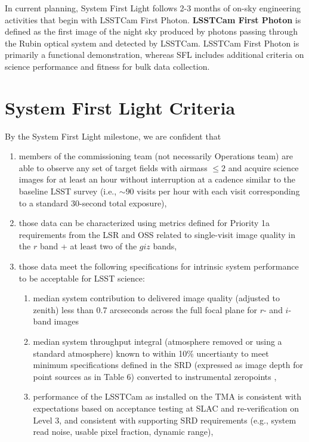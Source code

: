 \documentclass[SE,authoryear,toc]{lsstdoc}
\begin{document}
In current planning, System First Light follows 2-3 months of on-sky engineering activities that begin with LSSTCam First Photon.
\textbf {LSSTCam First Photon} is defined as the first image of the night sky produced by photons passing through the Rubin optical system and detected by LSSTCam.
LSSTCam First Photon is primarily a functional demonstration, whereas SFL includes additional criteria on science performance and fitness for bulk data collection.

\section{System First Light Criteria}
\label{criteria}

By the System First Light milestone, we are confident that

\begin{enumerate}
  \item members of the commissioning team (not necessarily Operations team) are able to observe any set of target fields with airmass $\leq 2$ and acquire science images for at least an hour without interruption at a cadence similar to the baseline LSST survey (i.e., $\sim90$ visits per hour with each visit corresponding to a standard 30-second total exposure),
  \item those data can be characterized using metrics defined for Priority 1a requirements from the LSR  and OSS  related to single-visit image quality in the $r$ band + at least two of the $giz$ bands,
  \item those data meet the following specifications for intrinsic system performance to be acceptable for LSST science:
  \begin{enumerate}
    \item median system contribution to delivered image quality (adjusted to zenith) less than 0.7 arcseconds across the full focal plane for $r$- and $i$-band images
    \item median system throughput integral (atmosphere removed or using a standard atmosphere) known to within 10\% uncertianty to meet minimum specifications defined in the SRD (expressed as image depth for point sources as in Table 6) converted to instrumental zeropoints ,
    \item performance of the LSSTCam as installed on the TMA is consistent with expectations based on acceptance testing at SLAC and re-verification on Level 3, and consistent with supporting SRD requirements (e.g., system read noise, usable pixel fraction, dynamic range),

\end{enumerate}
\end{enumerate}
\end{document}

